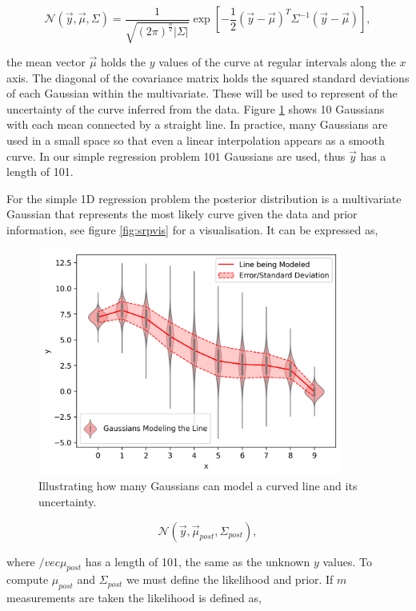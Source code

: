 \begin{equation}
  \mathcal{N}(\vec y, \vec{\mu}, \Sigma) = \frac{1}{\sqrt{(2\pi)^{\frac{n}{2}}|\Sigma|}} \exp \left[{{-\frac{1}{2}(\vec{y}-\vec{\mu})^T\Sigma^{-1}(\vec{y}-\vec{\mu})}}\right],
  \label{eq:mvg}
\end{equation}

\noindent the mean vector $\vec{\mu}$ holds the $y$ values of the curve at regular intervals along the $x$ axis. The diagonal of the covariance matrix holds the squared standard deviations of each Gaussian within the multivariate. These will be used to represent of the uncertainty of the curve inferred from the data. Figure \ref{fig:mvg} shows 10 Gaussians with each mean connected by a straight line. In practice, many Gaussians are used in a small space so that even a linear interpolation appears as a smooth curve. In our simple regression problem 101 Gaussians are used, thus $\vec y$ has a length of 101. 

For the simple 1D regression problem the posterior distribution is a multivariate Gaussian that represents the most likely curve given the data and prior information, see figure \ref{fig:srpvis} for a visualisation. It can be expressed as,

\begin{figure}
  \centering
  \includegraphics[width=10cm]{images/mvg.png}
  \caption{Illustrating how many Gaussians can model a curved line and its uncertainty.}
  \label{fig:mvg}
\end{figure}

\begin{equation}
  \mathcal{N}(\vec y, \vec{\mu}_{post}, \Sigma_{post}),
\end{equation}

\noindent where $/vec{\mu}_{post}$ has a length of 101, the same as the unknown $y$ values. To compute $\mu_{post}$ and $\Sigma_{post}$ we must define the likelihood and prior. If $m$ measurements are taken the likelihood is defined as, 


